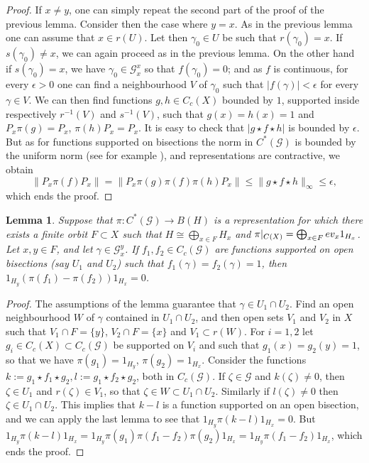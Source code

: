 \documentclass[11 pt, leqno, hidelinks]{amsart}%
\theoremstyle{plain}
\newtheorem{lemma}[theorem]{Lemma}
\numberwithin{equation}{section}
\newcommand{\G}{\mathcal{G}}
\newcommand{\GG}{\mathcal{G}}
\begin{document}
\begin{proof}
If $x \neq y$, one can simply repeat the second part of the proof of the previous lemma. Consider then the case where $y=x$. As in the previous lemma one can assume that $x \in r(U)$. Let then $\gamma_0 \in U$ be such that $r(\gamma_0)=x$.
If $s(\gamma_0)\neq x$, we can again proceed as in the previous lemma. On the other hand if $s(\gamma_0)=x$, we have $\gamma_0 \in \G_x^x$ so that $f(\gamma_0)=0$; and as $f$ is continuous, for every $\epsilon>0$ one can find a neighbourhood $V$ of $\gamma_0$ such that $|f(\gamma)|< \epsilon$ for every $\gamma \in V$.  We can then find functions $g,h \in C_c(X)$ bounded by $1$, supported inside respectively $r^{-1}(V)$ and $s^{-1}(V)$, such that $g(x)=h(x)=1$ and
$P_x \pi(g) = P_x$, $\pi(h) P_x = P_x$. It is easy to check  that $|g \star f \star h|$ is bounded by $\epsilon$. But as for functions supported on bisections the norm in  $C^*(\GG)$ is bounded by the uniform norm (see for example \cite[Proposition 9.2.1]{Aidan}), and representations are contractive,
we obtain
\[ \| P_x \pi(f) P_x\| = \|P_x \pi(g) \pi(f) \pi(h) P_x \| \leq \|g \star f \star h\|_{\infty} \leq \epsilon,\]
which ends the proof.
	\end{proof}



\begin{lemma} \label{lem:unique}
	Suppose  that $\pi:C^*(\GG)\to B(H)$ is a representation for which there exists a finite orbit $F\subset  X$ such that $H \cong \bigoplus_{x\in F} H_x$ and $\pi|_{C(X)} = \bigoplus_{x \in F} \textup{ev}_x 1_{H_x}$. Let $x,y \in F$, and let $\gamma \in \GG_{x}^y$. If $f_1, f_2 \in C_c(\GG)$ are functions supported on open bisections (say $U_1$ and $U_2$) such that $f_1(\gamma)=f_2(\gamma)=1$, then $1_{H_y} (\pi(f_1)-\pi(f_2)) 1_{H_x} =0$.
\end{lemma}

\begin{proof}
The assumptions of the lemma guarantee that $\gamma \in U_1 \cap U_2$. Find an open neighbourhood $W$ of $\gamma$ contained in $U_1 \cap U_2$, and then open sets $V_1$  and $V_2$ in $X$ such that $V_1 \cap F= \{y\}$, $V_2 \cap F=\{x\}$ and $V_1 \subset r(W)$. For $i=1,2$ let $g_i \in C_c(X)\subset C_c(\GG)$ be supported on $V_i$ and such that $g_1(x)=g_2(y)=1$, so that we have $\pi(g_1) = 1_{H_y}$, $\pi(g_2) = 1_{H_x}$.
Consider the functions $k:=g_1 \star f_1 \star g_2, l:=g_1 \star f_2 \star g_2$, both  in $C_c(\GG)$. If $\zeta\in \GG$ and $k(\zeta) \neq0$, then $\zeta \in U_1$ and $r(\zeta)\in V_1$, so that $\zeta \in W \subset U_1 \cap U_2$. Similarly if $l(\zeta)\neq 0$ then $\zeta \in U_1 \cap U_2$. This implies that $k-l$ is a function supported on an open bisection, and we can apply the last lemma to see that  $1_{H_y} \pi(k-l) 1_{H_x} =0$.
But   $1_{H_y} \pi(k-l) 1_{H_x} = 1_{H_y} \pi(g_1) \pi(f_1-f_2) \pi(g_2) 1_{H_x} =
1_{H_y}  \pi(f_1-f_2)  1_{H_x}$, which ends the proof.
\end{proof}
\end{document}
